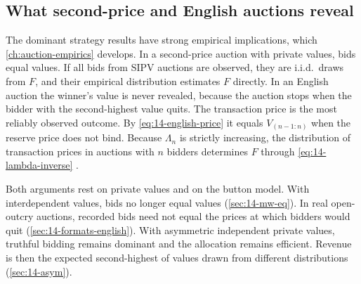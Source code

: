 \subsection{What second-price and English auctions reveal}\label{sec:14-spa-data}

The dominant strategy results have strong empirical implications, which \cref{ch:auction-empirics}
develops. In a second-price auction with private values, bids equal values. If all bids from SIPV auctions
are observed, they are i.i.d.\ draws from $F$, and their empirical distribution estimates $F$ directly. In
an English auction the winner's value is never revealed, because the auction stops when the bidder with the
second-highest value quits. The transaction price is the most reliably observed outcome. By
\eqref{eq:14-english-price} it equals $V_{(n-1:n)}$ when the reserve price does not bind. Because $\Lambda_n$ is
strictly increasing, the distribution of transaction prices in auctions with $n$ bidders determines $F$
through \eqref{eq:14-lambda-inverse} \citep[Theorem~1]{AtheyHaile2002}.

Both arguments rest on private values and on the button model. With interdependent values, bids no longer
equal values (\cref{sec:14-mw-eq}). In real open-outcry auctions, recorded bids need not equal the prices at
which bidders would quit (\cref{sec:14-formats-english}). With asymmetric independent private values,
truthful bidding remains dominant and the allocation remains efficient. Revenue is then the expected
second-highest of values drawn from different distributions (\cref{sec:14-asym}).
